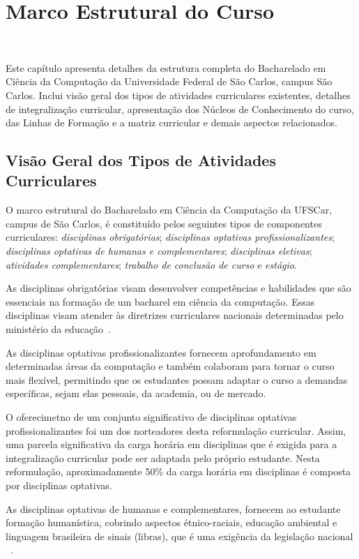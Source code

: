 \chapter{Marco Estrutural do Curso}~\label{sec:marco_estrutural}

Este capítulo apresenta detalhes da estrutura completa do Bacharelado em Ciência da Computação da Universidade Federal de São Carlos, campus São Carlos. Inclui visão geral dos tipos de atividades curriculares existentes, detalhes de integralização curricular, apresentação dos Núcleos de Conhecimento do curso, das Linhas de Formação e a matriz curricular e demais aspectos relacionados. 

\section{Visão Geral dos Tipos de Atividades Curriculares}

O marco estrutural do Bacharelado em Ciência da Computação da UFSCar, campus de São Carlos, é constituído pelos seguintes tipos de componentes curriculares: \textit{disciplinas obrigatórias}; \textit{disciplinas optativas profissionalizantes}; \textit{disciplinas optativas de humanas e complementares};
\textit{disciplinas eletivas};
\textit{atividades complementares}; \textit{trabalho de conclusão de curso} e \textit{estágio}. 


As disciplinas obrigatórias visam  desenvolver competências e habilidades que são essenciais na formação de um bacharel em ciência da computação. Essas disciplinas visam atender às diretrizes curriculares nacionais determinadas pelo ministério da educação~\cite{DCN-BCC}. 

As disciplinas optativas profissionalizantes fornecem aprofundamento em determinadas áreas da computação e também colaboram para tornar o curso mais flexível, permitindo que os estudantes possam adaptar o curso a demandas específicas, sejam elas pessoais, da academia, ou de mercado. 

O oferecimetno de um conjunto significativo de disciplinas optativas profissionalizantes foi um dos norteadores desta reformulação curricular. Assim, uma parcela significativa da carga horária em disciplinas que é exigida para a integralização curricular pode ser adaptada pelo próprio estudante. Nesta reformulação, aproximadamente 50\% da carga horária em disciplinas é composta por disciplinas optativas.

As disciplinas optativas de humanas e complementares, fornecem ao estudante formação humanística, cobrindo aspectos étnico-raciais, educação ambiental e linguagem brasileira de sinais (libras), que é uma exigência da legislação nacional ~\cite{Regimento-Geral-CursosGraduacao-UFSCar}. 

